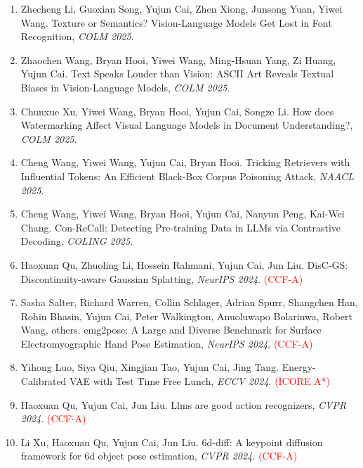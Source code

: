 \begin{enumerate}
\item Zhecheng Li, Guoxian Song, Yujun Cai, Zhen Xiong, Junsong Yuan, Yiwei Wang. Texture or Semantics? Vision-Language Models Get Lost in Font Recognition, \textit{COLM 2025}.

\item Zhaochen Wang, Bryan Hooi, Yiwei Wang, Ming-Hsuan Yang, Zi Huang, Yujun Cai. Text Speaks Louder than Vision: ASCII Art Reveals Textual Biases in Vision-Language Models, \textit{COLM 2025}.

\item Chunxue Xu, Yiwei Wang, Bryan Hooi, Yujun Cai, Songze Li. How does Watermarking Affect Visual Language Models in Document Understanding?, \textit{COLM 2025}.

\item Cheng Wang, Yiwei Wang, Yujun Cai, Bryan Hooi. Tricking Retrievers with Influential Tokens: An Efficient Black-Box Corpus Poisoning Attack, \textit{NAACL 2025}.

\item Cheng Wang, Yiwei Wang, Bryan Hooi, Yujun Cai, Nanyun Peng, Kai-Wei Chang. Con-ReCall: Detecting Pre-training Data in LLMs via Contrastive Decoding, \textit{COLING 2025}.

\item Haoxuan Qu, Zhuoling Li, Hossein Rahmani, Yujun Cai, Jun Liu. DisC-GS: Discontinuity-aware Gaussian Splatting, \textit{NeurIPS 2024}. \textcolor{red}{(CCF-A)}

\item Sasha Salter, Richard Warren, Collin Schlager, Adrian Spurr, Shangchen Han, Rohin Bhasin, Yujun Cai, Peter Walkington, Anuoluwapo Bolarinwa, Robert Wang, others. emg2pose: A Large and Diverse Benchmark for Surface Electromyographic Hand Pose Estimation, \textit{NeurIPS 2024}. \textcolor{red}{(CCF-A)}

\item Yihong Luo, Siya Qiu, Xingjian Tao, Yujun Cai, Jing Tang. Energy-Calibrated VAE with Test Time Free Lunch, \textit{ECCV 2024}. \textcolor{red}{(ICORE A*)}

\item Haoxuan Qu, Yujun Cai, Jun Liu. Llms are good action recognizers, \textit{CVPR 2024}. \textcolor{red}{(CCF-A)}

\item Li Xu, Haoxuan Qu, Yujun Cai, Jun Liu. 6d-diff: A keypoint diffusion framework for 6d object pose estimation, \textit{CVPR 2024}. \textcolor{red}{(CCF-A)}


\end{enumerate}
